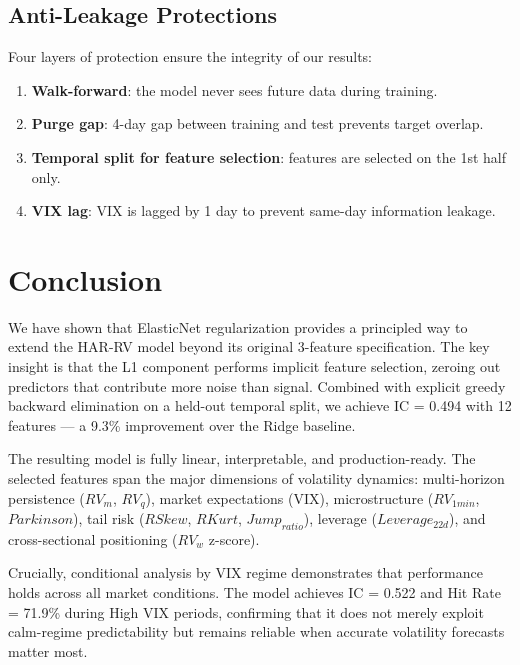 \documentclass[11pt,a4paper]{article}
\begin{document}
\subsection{Anti-Leakage Protections}

Four layers of protection ensure the integrity of our results:

\begin{enumerate}
    \item \textbf{Walk-forward}: the model never sees future data during training.
    \item \textbf{Purge gap}: 4-day gap between training and test prevents target overlap.
    \item \textbf{Temporal split for feature selection}: features are selected on the 1st half only.
    \item \textbf{VIX lag}: VIX is lagged by 1 day to prevent same-day information leakage.
\end{enumerate}

\section{Conclusion}
\label{sec:conclusion}

We have shown that ElasticNet regularization provides a principled way to extend the HAR-RV model beyond its original 3-feature specification. The key insight is that the L1 component performs implicit feature selection, zeroing out predictors that contribute more noise than signal. Combined with explicit greedy backward elimination on a held-out temporal split, we achieve IC = 0.494 with 12 features --- a 9.3\% improvement over the Ridge baseline.

The resulting model is fully linear, interpretable, and production-ready. The selected features span the major dimensions of volatility dynamics: multi-horizon persistence ($RV_m$, $RV_q$), market expectations (VIX), microstructure ($RV_{1min}$, $Parkinson$), tail risk ($RSkew$, $RKurt$, $Jump_{ratio}$), leverage ($Leverage_{22d}$), and cross-sectional positioning ($RV_w$ z-score).

Crucially, conditional analysis by VIX regime demonstrates that performance holds across all market conditions. The model achieves IC = 0.522 and Hit Rate = 71.9\% during High VIX periods, confirming that it does not merely exploit calm-regime predictability but remains reliable when accurate volatility forecasts matter most.
\end{document}
